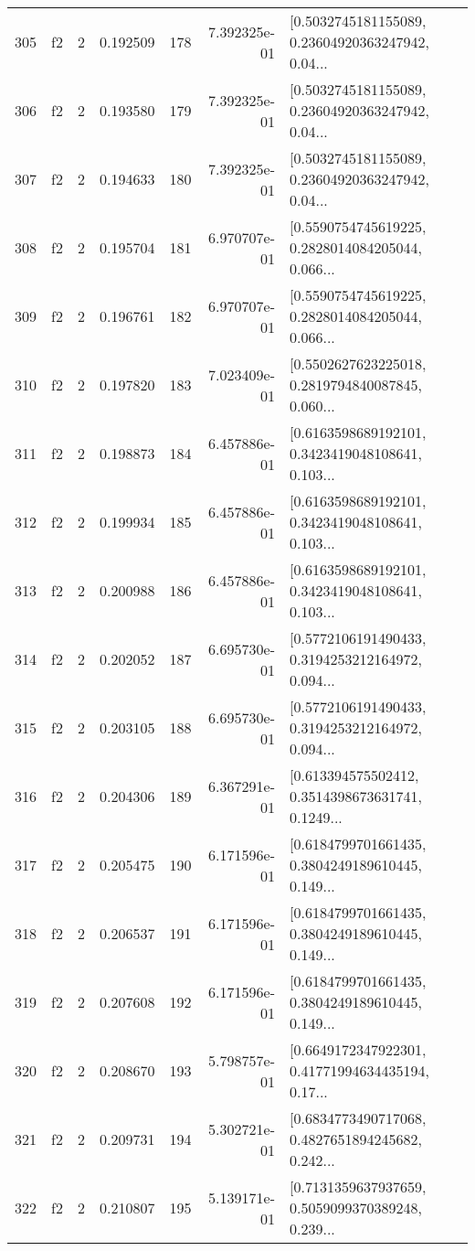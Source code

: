 \begin{tabular}{lllrlrl}
305 &  f2 &   2 &  0.192509 &  178 &  7.392325e-01 &  [0.5032745181155089, 0.23604920363247942, 0.04... \\
306 &  f2 &   2 &  0.193580 &  179 &  7.392325e-01 &  [0.5032745181155089, 0.23604920363247942, 0.04... \\
307 &  f2 &   2 &  0.194633 &  180 &  7.392325e-01 &  [0.5032745181155089, 0.23604920363247942, 0.04... \\
308 &  f2 &   2 &  0.195704 &  181 &  6.970707e-01 &  [0.5590754745619225, 0.2828014084205044, 0.066... \\
309 &  f2 &   2 &  0.196761 &  182 &  6.970707e-01 &  [0.5590754745619225, 0.2828014084205044, 0.066... \\
310 &  f2 &   2 &  0.197820 &  183 &  7.023409e-01 &  [0.5502627623225018, 0.2819794840087845, 0.060... \\
311 &  f2 &   2 &  0.198873 &  184 &  6.457886e-01 &  [0.6163598689192101, 0.3423419048108641, 0.103... \\
312 &  f2 &   2 &  0.199934 &  185 &  6.457886e-01 &  [0.6163598689192101, 0.3423419048108641, 0.103... \\
313 &  f2 &   2 &  0.200988 &  186 &  6.457886e-01 &  [0.6163598689192101, 0.3423419048108641, 0.103... \\
314 &  f2 &   2 &  0.202052 &  187 &  6.695730e-01 &  [0.5772106191490433, 0.3194253212164972, 0.094... \\
315 &  f2 &   2 &  0.203105 &  188 &  6.695730e-01 &  [0.5772106191490433, 0.3194253212164972, 0.094... \\
316 &  f2 &   2 &  0.204306 &  189 &  6.367291e-01 &  [0.613394575502412, 0.3514398673631741, 0.1249... \\
317 &  f2 &   2 &  0.205475 &  190 &  6.171596e-01 &  [0.6184799701661435, 0.3804249189610445, 0.149... \\
318 &  f2 &   2 &  0.206537 &  191 &  6.171596e-01 &  [0.6184799701661435, 0.3804249189610445, 0.149... \\
319 &  f2 &   2 &  0.207608 &  192 &  6.171596e-01 &  [0.6184799701661435, 0.3804249189610445, 0.149... \\
320 &  f2 &   2 &  0.208670 &  193 &  5.798757e-01 &  [0.6649172347922301, 0.41771994634435194, 0.17... \\
321 &  f2 &   2 &  0.209731 &  194 &  5.302721e-01 &  [0.6834773490717068, 0.4827651894245682, 0.242... \\
322 &  f2 &   2 &  0.210807 &  195 &  5.139171e-01 &  [0.7131359637937659, 0.5059099370389248, 0.239... \\

\end{tabular}
